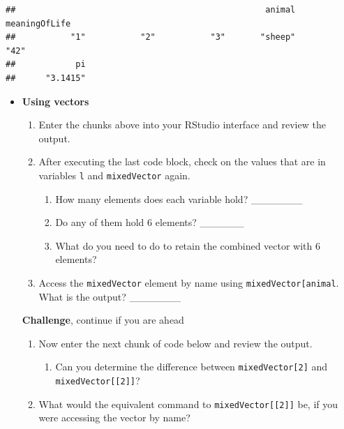 \documentclass[a4paper]{book}
\providecommand{\tightlist}{%
  \setlength{\itemsep}{0pt}\setlength{\parskip}{0pt}}
\newenvironment{rmdblock}[1]
  {\vspace{1.5em}\begin{shaded*}
  \begin{itemize}
  \renewcommand{\labelitemi}{
    \raisebox{-.7\height}[0pt][0pt]{
      {\setkeys{Gin}{width=3em,keepaspectratio}\texttt{[image: images/\#1]}}
    }
  }
  \item
  }
  {
  \end{itemize}
  \end{shaded*}
  }
\newenvironment{rmdexercise}
  {\begin{rmdblock}{exercise}}
  {\end{rmdblock}}
\begin{document}
\begin{verbatim}
##                                                  animal meaningOfLife 
##           "1"           "2"           "3"       "sheep"          "42" 
##            pi 
##      "3.1415"
\end{verbatim}

\begin{rmdexercise}
\textbf{Using vectors}

\begin{enumerate}
\def\labelenumi{\arabic{enumi}.}
\item
  Enter the chunks above into your RStudio interface and review the
  output.
\item
  After executing the last code block, check on the values that are in
  variables \texttt{l} and \texttt{mixedVector} again.

  \begin{enumerate}
  \def\labelenumii{\alph{enumii})}
  \tightlist
  \item
    How many elements does each variable hold? \_\_\_\_\_\_\_
  \item
    Do any of them hold 6 elements? \_\_\_\_\_\_
  \item
    What do you need to do to retain the combined vector with 6
    elements?
  \end{enumerate}
\item
  Access the \texttt{mixedVector} element by name using
  \texttt{mixedVector{[}\textquotesingle{}animal\textquotesingle{}{]}}.
  What is the output? \_\_\_\_\_\_\_
\end{enumerate}

\textbf{Challenge}, continue if you are ahead

\begin{enumerate}
\def\labelenumi{\arabic{enumi}.}
\setcounter{enumi}{3}
\item
  Now enter the next chunk of code below and review the output.

  \begin{enumerate}
  \def\labelenumii{\alph{enumii})}
  \tightlist
  \item
    Can you determine the difference between \texttt{mixedVector{[}2{]}}
    and \texttt{mixedVector{[}{[}2{]}{]}}?
  \end{enumerate}
\item
  What would the equivalent command to \texttt{mixedVector{[}{[}2{]}{]}}
  be, if you were accessing the vector by name?
\end{enumerate}
\end{rmdexercise}
\end{document}
